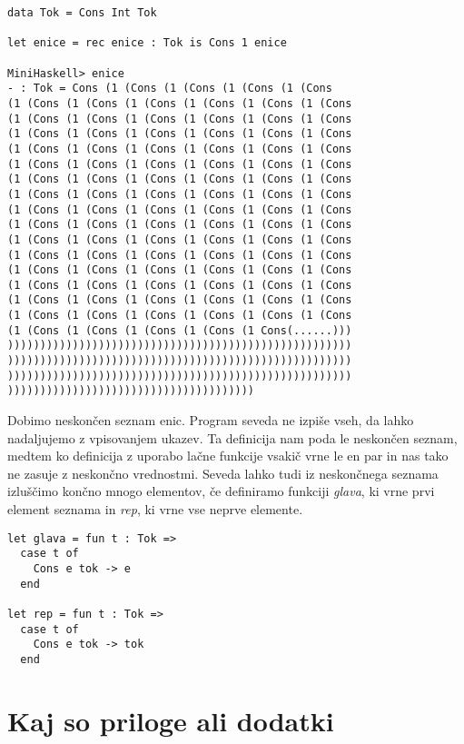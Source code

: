 \documentclass[12pt,a4paper,openany]{book}
\begin{document}
\begin{lstlisting}
data Tok = Cons Int Tok
  
let enice = rec enice : Tok is Cons 1 enice

MiniHaskell> enice
- : Tok = Cons (1 (Cons (1 (Cons (1 (Cons (1 (Cons 
(1 (Cons (1 (Cons (1 (Cons (1 (Cons (1 (Cons (1 (Cons 
(1 (Cons (1 (Cons (1 (Cons (1 (Cons (1 (Cons (1 (Cons 
(1 (Cons (1 (Cons (1 (Cons (1 (Cons (1 (Cons (1 (Cons 
(1 (Cons (1 (Cons (1 (Cons (1 (Cons (1 (Cons (1 (Cons 
(1 (Cons (1 (Cons (1 (Cons (1 (Cons (1 (Cons (1 (Cons 
(1 (Cons (1 (Cons (1 (Cons (1 (Cons (1 (Cons (1 (Cons 
(1 (Cons (1 (Cons (1 (Cons (1 (Cons (1 (Cons (1 (Cons 
(1 (Cons (1 (Cons (1 (Cons (1 (Cons (1 (Cons (1 (Cons 
(1 (Cons (1 (Cons (1 (Cons (1 (Cons (1 (Cons (1 (Cons 
(1 (Cons (1 (Cons (1 (Cons (1 (Cons (1 (Cons (1 (Cons 
(1 (Cons (1 (Cons (1 (Cons (1 (Cons (1 (Cons (1 (Cons 
(1 (Cons (1 (Cons (1 (Cons (1 (Cons (1 (Cons (1 (Cons 
(1 (Cons (1 (Cons (1 (Cons (1 (Cons (1 (Cons (1 (Cons 
(1 (Cons (1 (Cons (1 (Cons (1 (Cons (1 (Cons (1 (Cons 
(1 (Cons (1 (Cons (1 (Cons (1 (Cons (1 (Cons (1 (Cons 
(1 (Cons (1 (Cons (1 (Cons (1 (Cons (1 Cons(......)))
)))))))))))))))))))))))))))))))))))))))))))))))))))))
)))))))))))))))))))))))))))))))))))))))))))))))))))))
)))))))))))))))))))))))))))))))))))))))))))))))))))))
))))))))))))))))))))))))))))))))))))))
\end{lstlisting}
Dobimo neskončen seznam enic. Program seveda ne izpiše vseh, da lahko nadaljujemo z vpisovanjem ukazev. Ta definicija 
nam poda le neskončen seznam, medtem ko definicija z uporabo lačne funkcije vsakič vrne le en par in nas tako ne zasuje 
z neskončno vrednostmi. Seveda lahko tudi iz neskončnega seznama izluščimo končno mnogo elementov, če definiramo 
funkciji \emph{glava}, ki vrne prvi element seznama in \emph{rep}, ki vrne vse neprve elemente. 
\begin{lstlisting}
let glava = fun t : Tok =>
  case t of 
    Cons e tok -> e
  end

let rep = fun t : Tok =>
  case t of 
    Cons e tok -> tok
  end
\end{lstlisting}



\newpage


\appendix


\chapter{Kaj so priloge ali dodatki}
\end{document}
